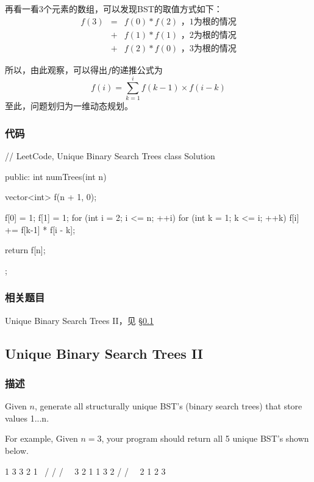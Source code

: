 再看一看3个元素的数组，可以发现BST的取值方式如下：
\begin{eqnarray}
f(3) &=& f(0) * f(2)   \text{ ，1为根的情况} \nonumber \\
     &+& f(1) * f(1)   \text{ ，2为根的情况} \nonumber \\
     &+& f(2) * f(0)   \text{ ，3为根的情况} \nonumber
\end{eqnarray}

所以，由此观察，可以得出$f$的递推公式为
$$
f(i) = \sum_{k=1}^{i} f(k-1) \times f(i-k)
$$
至此，问题划归为一维动态规划。


\subsubsection{代码}

\begin{Code}
// LeetCode, Unique Binary Search Trees
class Solution {
public:
    int numTrees(int n) {
        vector<int> f(n + 1, 0);

        f[0] = 1;
        f[1] = 1;
        for (int i = 2; i <= n; ++i) {
            for (int k = 1; k <= i; ++k)
                f[i] += f[k-1] * f[i - k];
        }

        return f[n];
    }
};
\end{Code}


\subsubsection{相关题目}
\begindot
\item Unique Binary Search Trees II，见 \S \ref{sec:unique-binary-search-trees-ii}
\myenddot


\subsection{Unique Binary Search Trees II}
\label{sec:unique-binary-search-trees-ii}


\subsubsection{描述}
Given $n$, generate all structurally unique BST's (binary search trees) that store values 1...n.

For example,
Given $n = 3$, your program should return all 5 unique BST's shown below.
\begin{Code}
   1         3     3      2      1
    \       /     /      / \      \
     3     2     1      1   3      2
    /     /       \                 \
   2     1         2                 3
\end{Code}


